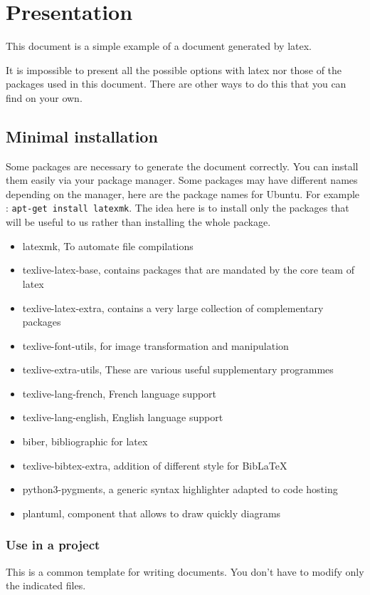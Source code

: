 \section{Presentation}
This document is a simple example of a document generated by \gls{latex}. \newline

It is impossible to present all the possible options with \gls{latex} nor those of the packages used
in this document.
There are other ways to do this that you can find on your own.

\subsection{Minimal installation}
Some packages are necessary to generate the document correctly. You can install them easily via your
package manager. Some packages may have different names depending on the manager, here are the
package names for Ubuntu. For example : \texttt{apt-get install latexmk}.\newline
The idea here is to install only the packages that will be useful to us rather than installing the
whole package.
\begin{itemize}
    \item latexmk, To automate file compilations
    \item texlive-latex-base, contains packages that are mandated by the core team of \gls{latex}
    \item texlive-latex-extra, contains a very large collection of complementary packages
    \item texlive-font-utils, for image transformation and manipulation
    \item texlive-extra-utils, These are various useful supplementary programmes
    \item texlive-lang-french, French language support
    \item texlive-lang-english, English language support
    \item biber, bibliographic for \gls{latex}
    \item texlive-bibtex-extra, addition of different style for BibLaTeX
    \item python3-pygments, a generic syntax highlighter adapted to code hosting
    \item plantuml, component that allows to draw quickly diagrams
\end{itemize}

\subsubsection{Use in a project}
This is a common template for writing documents. You don't have to modify only the indicated files.

